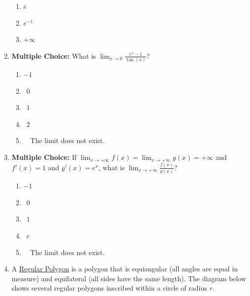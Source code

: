 \documentclass[12pt]{article}
\newif\ifans
\begin{document}
\begin{enumerate}
\begin{enumerate}
\item $e$\\

\item $e^{-1}$\\

\item $+\infty$

\end{enumerate}

\ifans{\fbox{E}} \fi

\item {\bf Multiple Choice:} What is $\displaystyle \lim_{x\rightarrow 0}\frac{e^x-1}{\tan(x)}$?

\begin{enumerate}

\item $-1$

\item $\ \ 0$

\item $\ \ 1$

\item $\ \ 2$

\item \ \ The limit does not exist.

\end{enumerate}

\ifans{\fbox{C}} \fi

\item {\bf Multiple Choice:} If $\displaystyle \lim_{x\rightarrow +\infty} f(x) =
\lim_{x\rightarrow +\infty} g(x) = +\infty$ and $f'(x)=1$ and $g'(x)=e^x$, what is 
$\displaystyle \lim_{x\rightarrow +\infty}\frac{f(x)}{g(x)}$?

\begin{enumerate}

\item $-1$

\item $\ \ 0$

\item $\ \ 1$

\item $\ \ e$

\item \ \ The limit does not exist.

\end{enumerate}

\ifans{\fbox{B}} \fi

\item A \underline{Regular Polygon} is a polygon that is equiangular (all angles are equal in measure) and equilateral (all sides have the same length).  The diagram below shows several regular polygons inscribed within a circle of radius $r$.


\end{enumerate}
\end{document}
